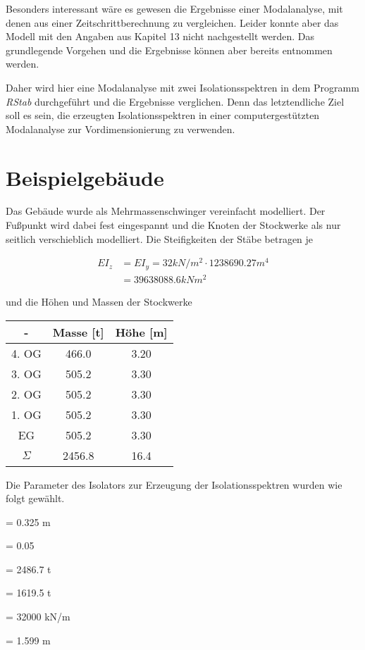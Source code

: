Besonders interessant wäre es gewesen die Ergebnisse einer Modalanalyse, mit denen aus einer Zeitschrittberechnung zu vergleichen. Leider konnte aber das Modell mit den Angaben aus Kapitel 13 \cite{Isemann} nicht nachgestellt werden.
Das grundlegende Vorgehen und die Ergebnisse können aber bereits entnommen werden.

Daher wird hier eine Modalanalyse mit zwei Isolationsspektren in dem Programm \emph{RStab} durchgeführt und die Ergebnisse verglichen. Denn das letztendliche Ziel soll es sein, die erzeugten Isolationsspektren in einer computergestützten Modalanalyse zur Vordimensionierung zu verwenden.


\section{Beispielgebäude}
\label{sec:besipielgebaude}

Das Gebäude wurde als Mehrmassenschwinger vereinfacht modelliert. Der Fußpunkt wird dabei fest eingespannt und die Knoten der Stockwerke als nur seitlich verschieblich modelliert. Die Steifigkeiten der Stäbe betragen je

\begin{align*}
EI_z &= EI_y = 32 kN/m^2 \cdot 1238690.27 m^4\\
     &= 39638088.6 kNm^2
\end{align*}

und die Höhen und Massen der Stockwerke

\begin{table}[H]
\centering
\begin{tabular}{ |c|c|c| } 
 \hline
 - & Masse [t] & Höhe [m]\\
 \hline\hline
4. OG & 466.0 & 3.20\\
3. OG & 505.2 & 3.30\\
2. OG & 505.2 & 3.30\\
1. OG & 505.2 & 3.30\\
EG    & 505.2 & 3.30\\
 \hline \hline
$\Sigma$ & 2456.8 & 16.4\\
\hline
\end{tabular}
\end{table}

Die Parameter des Isolators zur Erzeugung der Isolationsspektren wurden wie folgt gewählt.

    = 0.325 m \par
\makebox[1cm]{$\mu$}  = 0.05\par
{}  = 2486.7 t\par
{}  = 1619.5 t\par
{}  = 32000 kN/m \par
{}    = 1.599 m\par

